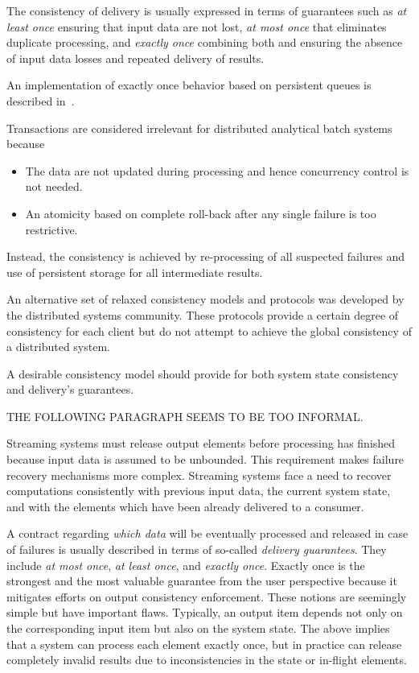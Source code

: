 The consistency of delivery is usually expressed in terms of guarantees such as  {\em at least once}  ensuring that input data are not lost, {\em at most once}  that eliminates duplicate processing, and {\em exactly once} combining both and ensuring the absence of input data losses and repeated delivery of results.   

An implementation of exactly once behavior based on persistent queues is described in~\cite{DBLP:books/mk/WeikumV2002}.  

Transactions are considered irrelevant for distributed analytical batch systems  because 

\begin {itemize}
\item The data are not updated during processing and hence concurrency control is not needed.
\item An atomicity based on complete roll-back after any single failure is too restrictive. 
\end {itemize}

Instead, the consistency is achieved by re-processing of all suspected failures and use of persistent storage for all intermediate results.

An alternative set of relaxed consistency models and protocols was developed by the distributed systems community. These protocols provide a certain degree of consistency for each client but do not attempt to achieve the global consistency of a distributed system.

A desirable consistency model should provide for both system state consistency and delivery's guarantees. 

THE FOLLOWING PARAGRAPH SEEMS TO BE TOO INFORMAL.      

Streaming systems must release output elements before processing has finished because input data is assumed to be unbounded. This requirement makes failure recovery mechanisms more complex. Streaming systems face a need to recover computations consistently with previous input data, the current system state, and with the elements which have been already delivered to a consumer. 

A contract regarding {\em which data} will be eventually processed and released in case of failures is usually described in terms of so-called {\em delivery guarantees}. They include {\em at most once}, {\em at least once}, and {\em exactly once}. Exactly once is the strongest and the most valuable guarantee from the user perspective because it mitigates efforts on output consistency enforcement. 
These notions are seemingly simple but have important flaws. Typically, an output item depends not only on the corresponding input item but also on the system state. 
The above implies that a system can process each element exactly once, but in practice can release completely invalid results due to inconsistencies in the state or in-flight elements.

